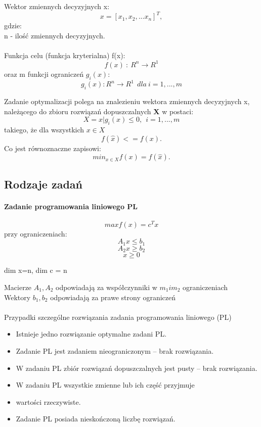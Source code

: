 \documentclass[]{report}
\begin{document}
Wektor zmiennych decyzyjnych x:
\[x=[x_1, x_2,...x_n]^T,\]
gdzie:\\
n - ilość zmiennych decyzyjnych.
\\\\
Funkcja celu (funkcja kryterialna) f(x):  
\[f(x)~:~R^n \longrightarrow R^1\]
oraz m funkcji ograniczeń $g_i(x)$:
\[g_i(x): R^n \longrightarrow R^1~~dla~i=1,...,m\]

Zadanie optymalizacji polega na znalezieniu wektora zmiennych decyzyjnych 
x, należącego do zbioru rozwiązań dopuszczalnych \textbf{X} w postaci:
\[X = {x|g_i(x) \le 0,~~i=1,...,m}\]
takiego, że dla wszystkich $x \in X$
\[f(\hat{x})<= f(x).\]
Co jest równoznaczne zapisowi:
\[min_{x \in X} f(x) = f(\hat{x}).\]

\subsection{Rodzaje zadań}


\paragraph{Zadanie programowania liniowego PL} 

\[ max f(x) = c^T x \]
przy ograniczeniach: 
\[A_1 x \le b_1\]
\[A_2 x \ge b_2\]
\[x \ge 0\]
  
\begin{center}
dim x=n, dim c = n
\end{center}
Macierze $A_1, A_2$ odpowiadają za współczynniki w $m_1 i m_2$ ograniczeniach
\\
Wektory $b_1, b_2$ odpowiadają za prawe strony ograniczeń
\\ \\
Przypadki szczególne rozwiązania zadania programowania liniowego
(PL)

\begin{itemize}
\item Istnieje jedno rozwiązanie optymalne zadani PL.
\item Zadanie PL jest zadaniem nieograniczonym – brak rozwiązania.
\item W zadaniu PL zbiór rozwiązań dopuszczalnych jest pusty – brak
rozwiązania.
\item W zadaniu PL wszystkie zmienne lub ich część przyjmuje
\item wartości rzeczywiste.
\item Zadanie PL posiada nieskończoną liczbę rozwiązań.
\end{itemize}
 
\end{document}
